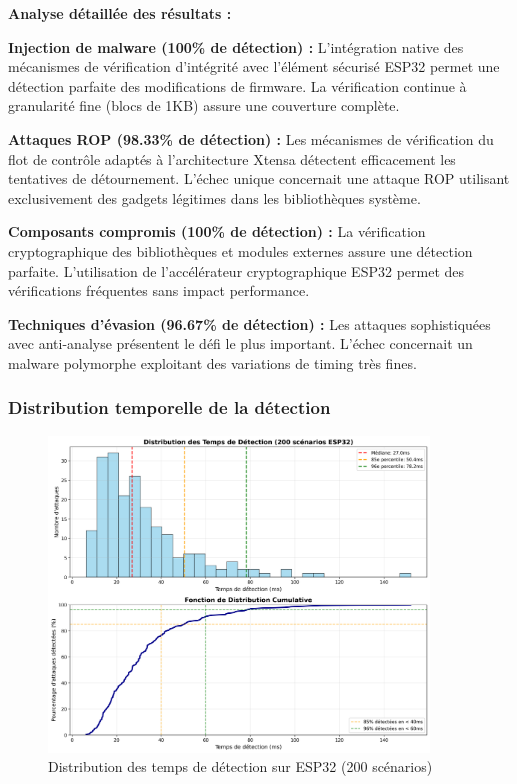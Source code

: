 \textbf{Analyse détaillée des résultats :}

\textbf{Injection de malware (100\% de détection) :} L'intégration native des mécanismes de vérification d'intégrité avec l'élément sécurisé ESP32 permet une détection parfaite des modifications de firmware. La vérification continue à granularité fine (blocs de 1KB) assure une couverture complète.

\textbf{Attaques ROP (98.33\% de détection) :} Les mécanismes de vérification du flot de contrôle adaptés à l'architecture Xtensa détectent efficacement les tentatives de détournement. L'échec unique concernait une attaque ROP utilisant exclusivement des gadgets légitimes dans les bibliothèques système.

\textbf{Composants compromis (100\% de détection) :} La vérification cryptographique des bibliothèques et modules externes assure une détection parfaite. L'utilisation de l'accélérateur cryptographique ESP32 permet des vérifications fréquentes sans impact performance.

\textbf{Techniques d'évasion (96.67\% de détection) :} Les attaques sophistiquées avec anti-analyse présentent le défi le plus important. L'échec concernait un malware polymorphe exploitant des variations de timing très fines.

\subsubsection{Distribution temporelle de la détection}

\begin{figure}[h]
    \centering
    \includegraphics[width=0.9\textwidth]{assets/figures/detection_timeline_esp32.png}
    \caption{Distribution des temps de détection sur ESP32 (200 scénarios)}
    \label{fig:detection-timeline-esp32}
\end{figure}

